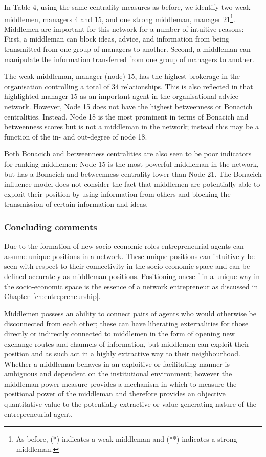 In Table 4, using the same centrality measures as before, we identify two weak middlemen, managers 4 and 15, and one strong middleman, manager 21\footnote{As before, (*) indicates a weak middleman and (**) indicates a strong middleman.}. Middlemen are important for this network for a number of intuitive reasons: First, a middleman can block ideas, advice, and information from being transmitted from one group of managers to another. Second, a middleman can manipulate the information transferred from one group of managers to another.

The weak middleman, manager (node) 15, has the highest brokerage in the organisation controlling a total of 34 relationships. This is also reflected in that \citet{Krackhardt1987} highlighted manager 15 as an important agent in the organisational advice network. However, Node 15 does not have the highest betweenness or Bonacich centralities. Instead, Node 18 is the most prominent in terms of Bonacich and betweenness scores but is not a middleman in the network; instead this may be a function of the in- and out-degree of node 18.

Both Bonacich and betweenness centralities are also seen to be poor indicators for ranking middlemen: Node 15 is the most powerful middleman in the network, but has a Bonacich and betweenness centrality lower than Node 21. The Bonacich influence model does not consider the fact that middlemen are potentially able to exploit their position by using information from others and blocking the transmission of certain information and ideas.

\subsubsection{Concluding comments}

Due to the formation of new socio-economic roles entrepreneurial agents can assume unique positions in a network. These unique positions can intuitively be seen with respect to their connectivity in the socio-economic space and can be defined accurately as middleman positions. Positioning oneself in a unique way in the socio-economic space is the essence of a network entrepreneur as discussed in Chapter~\ref{ch:entrepreneurship}. 

Middlemen possess an ability to connect pairs of agents who would otherwise be disconnected from each other; these can have liberating externalities for those directly or indirectly connected to middlemen in the form of opening new exchange routes and channels of information, but middlemen can exploit their position and as such act in a highly extractive way to their neighbourhood. Whether a middleman behaves in an exploitive or facilitating manner is ambiguous and dependent on the institutional environment; however the middleman power measure provides a mechanism in which to measure the positional power of the middleman and therefore provides an objective quantitative value to the potentially extractive or value-generating nature of the entrepreneurial agent.

